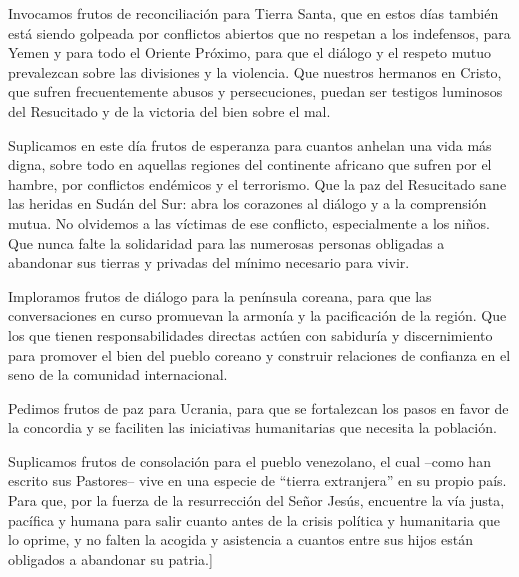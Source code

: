 			\begin{body}\begin{bodysmall}Invocamos frutos de reconciliación para Tierra Santa, que en estos días también está siendo golpeada por conflictos abiertos que no respetan a los indefensos, para Yemen y para todo el Oriente Próximo, para que el diálogo y el respeto mutuo prevalezcan sobre las divisiones y la violencia. Que nuestros hermanos en Cristo, que sufren frecuentemente abusos y persecuciones, puedan ser testigos luminosos del Resucitado y de la victoria del bien sobre el mal.\end{bodysmall}\end{body}
			
			\begin{body}\begin{bodysmall}Suplicamos en este día frutos de esperanza para cuantos anhelan una vida más digna, sobre todo en aquellas regiones del continente africano que sufren por el hambre, por conflictos endémicos y el terrorismo. Que la paz del Resucitado sane las heridas en Sudán del Sur: abra los corazones al diálogo y a la comprensión mutua. No olvidemos a las víctimas de ese conflicto, especialmente a los niños. Que nunca falte la solidaridad para las numerosas personas obligadas a abandonar sus tierras y privadas del mínimo necesario para vivir.\end{bodysmall}\end{body}
			
			\begin{body}\begin{bodysmall}Imploramos frutos de diálogo para la península coreana, para que las conversaciones en curso promuevan la armonía y la pacificación de la región. Que los que tienen responsabilidades directas actúen con sabiduría y discernimiento para promover el bien del pueblo coreano y construir relaciones de confianza en el seno de la comunidad internacional.\end{bodysmall}\end{body}
			
			\begin{body}\begin{bodysmall}Pedimos frutos de paz para Ucrania, para que se fortalezcan los pasos en favor de la concordia y se faciliten las iniciativas humanitarias que necesita la población.\end{bodysmall}\end{body}
			
			\begin{body}\begin{bodysmall}Suplicamos frutos de consolación para el pueblo venezolano, el cual –como han escrito sus Pastores– vive en una especie de “tierra extranjera” en su propio país. Para que, por la fuerza de la resurrección del Señor Jesús, encuentre la vía justa, pacífica y humana para salir cuanto antes de la crisis política y humanitaria que lo oprime, y no falten la acogida y asistencia a cuantos entre sus hijos están obligados a abandonar su patria.]\end{bodysmall}\end{body}
			
